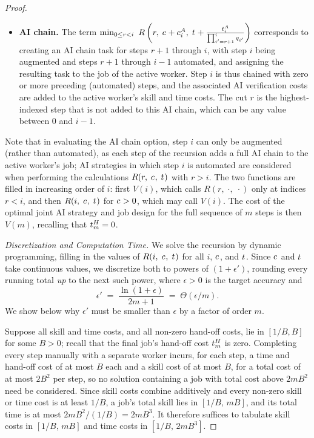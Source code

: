 \begin{proof}
\begin{itemize}
    \item \textbf{AI chain.}
    The term $\min_{0 \le r < i} \ R\left(r,\; c_{} + c^{A}_{i},\; t_{} + \frac{t^{A}_{i}}{\prod_{i'=r+1}^{i} q_{i'}}\right)$ corresponds to creating an AI chain task for steps $r+1$ through $i$, with step $i$ being augmented and steps $r+1$ through $i-1$ automated, and assigning the resulting task to the job of the active worker.
    Step $i$ is thus chained with zero or more preceding (automated) steps, and the associated AI verification costs are added to the active worker's skill and time costs.
    The cut $r$ is the highest-indexed step that is not added to this AI chain, which can be any value between $0$ and $i-1$.
\end{itemize}
Note that in evaluating the AI chain option, step $i$ can only be augmented (rather than automated), as each step of the recursion adds a full AI chain to the active worker's job; AI strategies in which step $i$ is automated are considered when performing the calculations $R(r,\; c_{},\; t_{})$ with $r > i$.
The two functions are filled in increasing order of $i$: first $V(i)$, which calls $R(r,\; \cdot,\; \cdot)$ only at indices $r < i$, and then $R(i,\; c_{},\; t_{})$ for $c_{} > 0$, which may call $V(i)$.
The cost of the optimal joint AI strategy and job design for the full sequence of $m$ steps is then $V(m)$, recalling that $t^{H}_{m} = 0$.

\emph{Discretization and Computation Time.}
We solve the recursion by dynamic programming, filling in the values of $R(i,\; c_{},\; t_{})$ for all $i$, $c_{}$, and $t_{}$.
Since $c_{}$ and $t_{}$ take continuous values, we discretize both to powers of $(1+\epsilon')$, rounding every running total \emph{up} to the next such power, where $\epsilon>0$ is the target accuracy and
\[
\epsilon' \;=\; \frac{\ln(1+\epsilon)}{2m+1} \;=\; \Theta(\epsilon/m).
\]
We show below why $\epsilon'$ must be smaller than $\epsilon$ by a factor of order $m$.

Suppose all skill and time costs, and all non-zero hand-off costs, lie in $[1/B, B]$ for some $B > 0$; recall that the final job's hand-off cost $t^{H}_{m}$ is zero.
Completing every step manually with a separate worker incurs, for each step, a time and hand-off cost of at most $B$ each and a skill cost of at most $B$, for a total cost of at most $2B^2$ per step, so no solution containing a job with total cost above $2mB^2$ need be considered.
Since skill costs combine additively and every non-zero skill or time cost is at least $1/B$, a job's total skill lies in $[1/B,\, mB]$, and its total time is at most $2mB^2/(1/B) = 2mB^3$.
It therefore suffices to tabulate skill costs in $[1/B,\, mB]$ and time costs in $[1/B,\, 2mB^3]$.


\end{proof}

